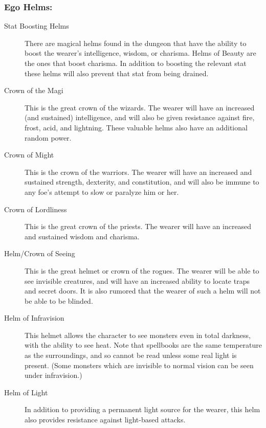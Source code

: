 \subsubsection{Ego Helms:}
\begin{description}
\item[Stat Boosting Helms]
     There are magical helms found in the dungeon that have the ability
     to boost the wearer's intelligence, wisdom, or charisma. Helms of
     Beauty are the ones that boost charisma. In addition to boosting
     the relevant stat these helms will also prevent that stat from being
     drained.

\item[Crown of the Magi]
     This is the great crown of the wizards. The wearer will have an
     increased (and sustained) intelligence, and will also be given
     resistance against fire, frost, acid, and lightning. These valuable
     helms also have an additional random power.

\item[Crown of Might]
     This is the crown of the warriors. The wearer will have an
     increased and sustained strength, dexterity, and constitution,
     and will also be immune to any foe's attempt to slow or paralyze
     him or her.

\item[Crown of Lordliness]
     This is the great crown of the priests. The wearer will have an
     increased and sustained wisdom and charisma.

\item[Helm/Crown of Seeing]
     This is the great helmet or crown of the rogues. The wearer will be
     able to see invisible creatures, and will have an increased ability to
     locate traps and secret doors. It is also rumored that the wearer of
     such a helm will not be able to be blinded.

\item[Helm of Infravision]
     This helmet allows the character to see monsters even in total
     darkness, with the ability to see heat. Note that spellbooks are the
     same temperature as the surroundings, and so cannot be read unless
     some real light is present. (Some monsters which are invisible to
     normal vision can be seen under infravision.)

\item[Helm of Light]
     In addition to providing a permanent light source for the wearer, this
     helm also provides resistance against light-based attacks.


\end{description}
